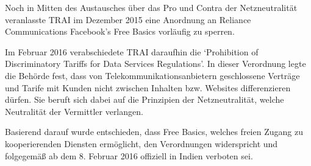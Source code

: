 \documentclass{article}
\begin{document}
Noch in Mitten des Austausches über das Pro und Contra der Netzneutralität veranlasste TRAI im Dezember 2015 eine Anordnung an Reliance Communications Facebook's Free Basics vorläufig zu sperren.
\autocite{Internet governance as 'ideology in practice' - India's 'Free Basics' controversy}

Im Februar 2016 verabschiedete TRAI daraufhin die `Prohibition of Discriminatory Tariffs for Data Services Regulations'.
In dieser Verordnung legte die Behörde fest, dass von Telekommunikationsanbietern geschlossene Verträge und Tarife mit Kunden nicht zwischen Inhalten bzw. Websites differenzieren dürfen. Sie beruft sich dabei auf die Prinzipien der Netzneutralität, welche Neutralität der Vermittler verlangen.

Basierend darauf wurde entschieden, dass Free Basics, welches freien Zugang zu kooperierenden Diensten ermöglicht, den
Verordnungen widerspricht und folgegemäß ab dem 8. Februar 2016 offiziell in Indien verboten sei.

\end{document}
